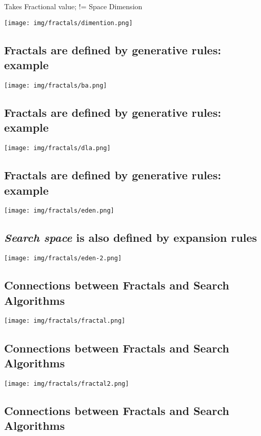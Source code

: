 Takes Fractional value; != Space Dimension

\texttt{[image: img/fractals/dimention.png]}

\subsection{Fractals are defined by generative rules: example}
\label{sec-17-3}

\texttt{[image: img/fractals/ba.png]}

\subsection{Fractals are defined by generative rules: example}
\label{sec-17-4}

\texttt{[image: img/fractals/dla.png]}

\subsection{Fractals are defined by generative rules: example}
\label{sec-17-5}

\texttt{[image: img/fractals/eden.png]}

\subsection{\textbf{\emph{Search space}} is also defined by expansion rules}
\label{sec-17-6}

\texttt{[image: img/fractals/eden-2.png]}

\subsection{Connections between Fractals and Search Algorithms}
\label{sec-17-7}

\texttt{[image: img/fractals/fractal.png]}

\subsection{Connections between Fractals and Search Algorithms}
\label{sec-17-8}

\texttt{[image: img/fractals/fractal2.png]}

\subsection{Connections between Fractals and Search Algorithms}
\label{sec-17-9}

